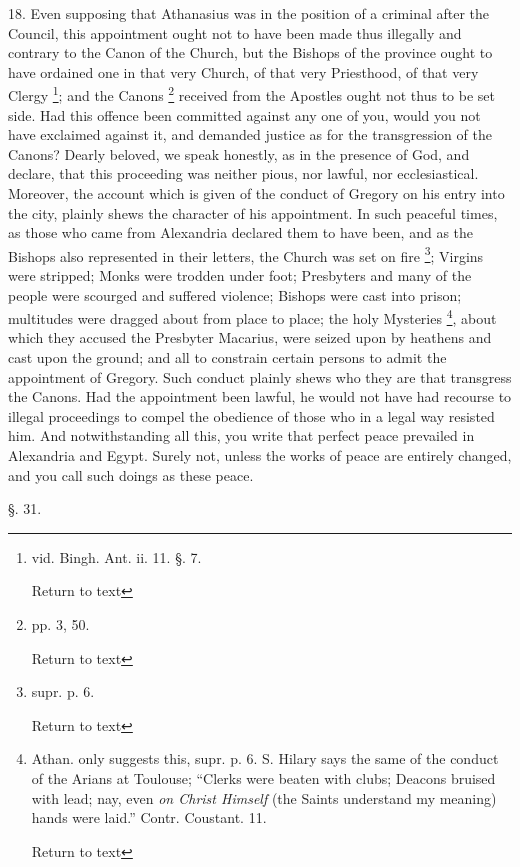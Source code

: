 18. Even supposing that Athanasius was in the
position of a criminal after the Council, this appointment ought not
to have been made thus illegally and contrary to the Canon of the
Church, but the Bishops of the province ought to have ordained
one in that very Church, of that very Priesthood, of that very Clergy
\footnote{vid. Bingh. Ant. ii. 11. §. 7.

Return to text}; and the Canons \footnote{pp. 3, 50.

Return to text} received from the Apostles ought not thus to be set side. Had
this offence been committed against any one of you, would you not have
exclaimed against it, and demanded justice as for the transgression of
the Canons? Dearly beloved, we speak honestly, as in the presence of
God, and declare, that this proceeding was neither pious, nor lawful,
nor ecclesiastical. Moreover, the account which is given of the
conduct of Gregory on his entry into the city, plainly shews the
character of his appointment. In such peaceful times, as those who
came from Alexandria declared them to have been, and as the Bishops
also represented in their letters, the Church was set on fire \footnote{supr. p. 6.

Return to text}; Virgins were stripped; Monks were trodden under foot;
Presbyters and many of the people were scourged and suffered violence;
Bishops were cast into prison; multitudes were dragged about from
place to place; the holy Mysteries \footnote{Athan. only suggests this, supr. p. 6. S. Hilary says the same of the
conduct of the Arians at Toulouse; ``Clerks were beaten with clubs;
Deacons bruised with lead; nay, even \emph{on Christ Himself} (the
Saints understand my meaning) hands were laid.'' Contr. Coustant. 11.

Return to text}, about which they accused the Presbyter Macarius, were seized
upon by heathens and cast upon the ground; and all to constrain
certain persons to admit the appointment of Gregory. Such conduct
plainly shews who they are that transgress the Canons. Had the
appointment been lawful, he would not have had recourse to illegal
proceedings to compel the obedience of those who in a legal way
resisted him. And notwithstanding all this, you write that perfect
peace prevailed in Alexandria and Egypt. Surely not, unless the works
of peace are entirely changed, and you call such doings as these
peace.

§. 31.

